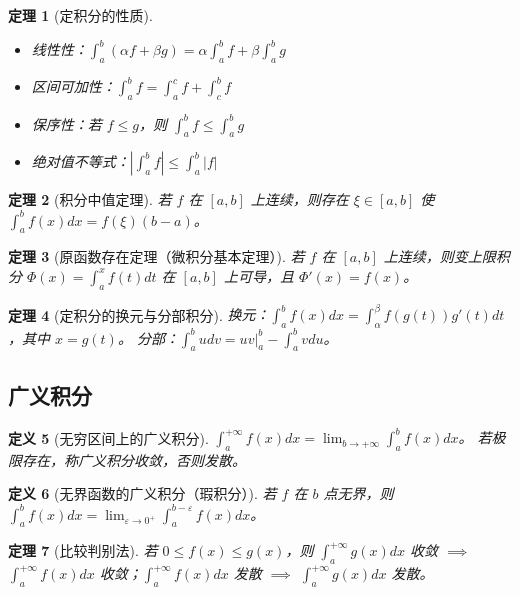 \documentclass[12pt,a4paper]{ctexart}
\newtheorem{theorem}{定理}[section]
\newtheorem{definition}[theorem]{定义}
\theoremstyle{remark}
\begin{document}
\begin{theorem}[定积分的性质]
\begin{itemize}
  \item 线性性：$\int_a^b (\alpha f + \beta g) = \alpha \int_a^b f + \beta \int_a^b g$
  \item 区间可加性：$\int_a^b f = \int_a^c f + \int_c^b f$
  \item 保序性：若 $f \le g$，则 $\int_a^b f \le \int_a^b g$
  \item 绝对值不等式：$|\int_a^b f| \le \int_a^b |f|$
\end{itemize}
\end{theorem}

\begin{theorem}[积分中值定理]
若 $f$ 在 $[a,b]$ 上连续，则存在 $\xi \in [a,b]$ 使
$\int_a^b f(x) dx = f(\xi)(b-a)$。
\end{theorem}

\begin{theorem}[原函数存在定理（微积分基本定理）]
若 $f$ 在 $[a,b]$ 上连续，则变上限积分 $\Phi(x) = \int_a^x f(t) dt$ 在 $[a,b]$
上可导，且 $\Phi'(x) = f(x)$。
\end{theorem}

\begin{theorem}[定积分的换元与分部积分]
换元：$\int_a^b f(x) dx = \int_{\alpha}^{\beta} f(g(t)) g'(t) dt$，其中 $x = g(t)$。
分部：$\int_a^b u dv = uv|_a^b - \int_a^b v du$。
\end{theorem}

\subsection{广义积分}

\begin{definition}[无穷区间上的广义积分]
$\int_a^{+\infty} f(x) dx = \lim_{b\to+\infty} \int_a^b f(x) dx$。
若极限存在，称广义积分收敛，否则发散。
\end{definition}

\begin{definition}[无界函数的广义积分（瑕积分）]
若 $f$ 在 $b$ 点无界，则 $\int_a^b f(x) dx = \lim_{\varepsilon\to 0^+} \int_a^{b-\varepsilon} f(x) dx$。
\end{definition}

\begin{theorem}[比较判别法]
若 $0 \le f(x) \le g(x)$，则 $\int_a^{+\infty} g(x)dx$ 收敛 $\implies$
$\int_a^{+\infty} f(x)dx$ 收敛；$\int_a^{+\infty} f(x)dx$ 发散 $\implies$
$\int_a^{+\infty} g(x)dx$ 发散。
\end{theorem}
\end{document}
